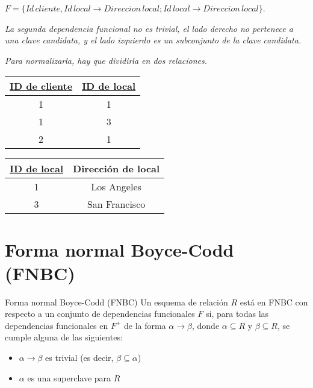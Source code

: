 \documentclass[a4paper, twoside]{article}
\begin{document}
$F=\{Id\, cliente,Id\, local\to Direccion\, local;Id\, local\to Direccion\, local\}$.

\emph{La segunda dependencia funcional no es trivial, el lado derecho no pertenece a una clave candidata, y el lado izquierdo es un subconjunto de la clave candidata.}

\emph{Para normalizarla, hay que dividirla en dos relaciones.}\\

\begin{minipage}{0.5\textwidth}
	\begin{center}
		\begin{tabular}{|c|c|}
			\hline 
			\uline{ID de cliente} & \uline{ID de local}\\
			\hline 
			\hline 
			1 & 1\\
			\hline 
			1 & 3\\
			\hline 
			2 & 1\\
			\hline 
		\end{tabular}
	\end{center}
\end{minipage}
\begin{minipage}{0.5\textwidth}
	\begin{center}
		\begin{tabular}{|c|c|}
			\hline 
			\uline{ID de local} & Dirección de local\\
			\hline 
			\hline 
			1 & Los Angeles\\
			\hline 
			3 & San Francisco\\
			\hline 
		\end{tabular}
	\end{center}
\end{minipage}

\section{Forma normal Boyce-Codd (FNBC)}
\begin{definicion}[0.9\textwidth]{Forma normal Boyce-Codd (FNBC)}
	Un esquema de relación $R$ está en FNBC con respecto a un conjunto de dependencias funcionales $F$ si, para todas las dependencias funcionales en $F^{+}$ de la forma $\alpha \to \beta$, donde $\alpha \subseteq R$ y $\beta \subseteq R$, se cumple alguna de las siguientes:
	\begin{itemize}
		\item $\alpha \to \beta$ es trivial (es decir, $\beta \subseteq \alpha$)
		\item $\alpha$ es una superclave para $R$ 
	\end{itemize}
\end{definicion}
\end{document}
